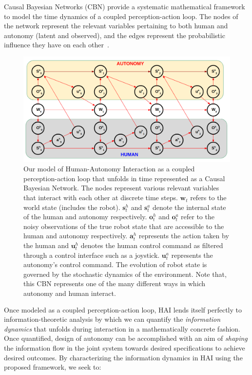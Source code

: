 \documentclass[12pt]{article}
\begin{document}
Causal Bayesian Networks (CBN) provide a systematic mathematical framework to model the time dynamics of a coupled perception-action loop. The nodes of the network represent the relevant variables pertaining to both human and autonomy (latent and observed), and the edges represent the probabilistic influence they have on each other~\cite{pearl2009causality}. 
\begin{figure}[t!]
	\includegraphics[keepaspectratio, width = 1\textwidth, center]{./figures/pa_loop.png}
	\caption{Our model of Human-Autonomy Interaction as a coupled perception-action loop that unfolds in time represented as a Causal Bayesian Network. The nodes represent various relevant variables that interact with each other at discrete time steps. $\textbf{w}_t$ refers to the world state (includes the robot). $\textbf{s}^h_t$ and $\textbf{s}^a_t$ denote the internal state of the human and autonomy respectively. $\textbf{o}^h_t$ and $\textbf{o}^a_t$ refer to the noisy observations of the true robot state that are accessible to the human and autonomy respectively. $\textbf{a}^h_t$ represents the action taken by the human and $\textbf{u}^h_t$ denotes the human control command as filtered through a control interface such as a joystick. $\textbf{u}^a_t$ represents the autonomy's control command. The evolution of robot state is governed by the stochastic dynamics of the environment. Note that, this CBN represents one of the many different ways in which autonomy and human interact.}
	\label{fig:cbn}
\end{figure}
Once modeled as a coupled perception-action loop, HAI lends itself perfectly to information-theoretic analysis by which we can quantify the \textit{information dynamics} that unfolds during interaction in a mathematically concrete fashion. Once quantified, design of autonomy can be accomplished with an aim of \textit{shaping} the information flow in the joint system towards desired specifications to achieve desired outcomes. By characterizing the information dynamics in HAI using the proposed framework, we seek to:
\end{document}
